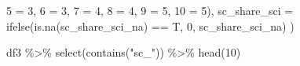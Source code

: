 \documentclass[
]{article}
\newenvironment{Shaded}{\begin{snugshade}}{\end{snugshade}}
\newcommand{\AttributeTok}[1]{\textcolor[rgb]{0.77,0.63,0.00}{#1}}
\newcommand{\DecValTok}[1]{\textcolor[rgb]{0.00,0.00,0.81}{#1}}
\newcommand{\FunctionTok}[1]{\textcolor[rgb]{0.00,0.00,0.00}{#1}}
\newcommand{\NormalTok}[1]{#1}
\newcommand{\OtherTok}[1]{\textcolor[rgb]{0.56,0.35,0.01}{#1}}
\newcommand{\SpecialCharTok}[1]{\textcolor[rgb]{0.00,0.00,0.00}{#1}}
\newcommand{\StringTok}[1]{\textcolor[rgb]{0.31,0.60,0.02}{#1}}
\begin{document}
\begin{Shaded}
\begin{Highlighting}[]
                                \StringTok{\textasciigrave{}}\AttributeTok{5}\StringTok{\textasciigrave{}} \OtherTok{=} \DecValTok{3}\NormalTok{,}
                                \StringTok{\textasciigrave{}}\AttributeTok{6}\StringTok{\textasciigrave{}} \OtherTok{=} \DecValTok{3}\NormalTok{,}
                                \StringTok{\textasciigrave{}}\AttributeTok{7}\StringTok{\textasciigrave{}} \OtherTok{=} \DecValTok{4}\NormalTok{,}
                                \StringTok{\textasciigrave{}}\AttributeTok{8}\StringTok{\textasciigrave{}} \OtherTok{=} \DecValTok{4}\NormalTok{,}
                                \StringTok{\textasciigrave{}}\AttributeTok{9}\StringTok{\textasciigrave{}} \OtherTok{=} \DecValTok{5}\NormalTok{,}
                                \StringTok{\textasciigrave{}}\AttributeTok{10}\StringTok{\textasciigrave{}} \OtherTok{=} \DecValTok{5}\NormalTok{),}
         \AttributeTok{sc\_share\_sci =} \FunctionTok{ifelse}\NormalTok{(}\FunctionTok{is.na}\NormalTok{(sc\_share\_sci\_na) }\SpecialCharTok{==}\NormalTok{ T, }\DecValTok{0}\NormalTok{, sc\_share\_sci\_na)}
\NormalTok{         )}
\end{Highlighting}
\end{Shaded}

\begin{Shaded}
\begin{Highlighting}[]
\NormalTok{df3 }\SpecialCharTok{\%\textgreater{}\%} 
  \FunctionTok{select}\NormalTok{(}\FunctionTok{contains}\NormalTok{(}\StringTok{"sc\_"}\NormalTok{)) }\SpecialCharTok{\%\textgreater{}\%} 
  \FunctionTok{head}\NormalTok{(}\DecValTok{10}\NormalTok{)}
\end{Highlighting}
\end{Shaded}
\end{document}
